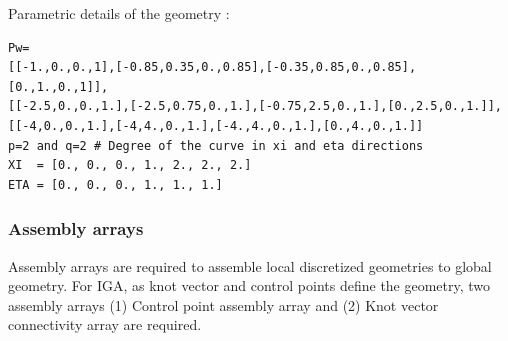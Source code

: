 \documentclass[11pt]{article}
\begin{document}
Parametric details of the geometry \cite{agrawal2019iga}:
\begin{verbatim}
Pw=
[[-1.,0.,0.,1],[-0.85,0.35,0.,0.85],[-0.35,0.85,0.,0.85],[0.,1.,0.,1]],
[[-2.5,0.,0.,1.],[-2.5,0.75,0.,1.],[-0.75,2.5,0.,1.],[0.,2.5,0.,1.]],
[[-4,0.,0.,1.],[-4,4.,0.,1.],[-4.,4.,0.,1.],[0.,4.,0.,1.]]
p=2 and q=2 # Degree of the curve in xi and eta directions
XI  = [0., 0., 0., 1., 2., 2., 2.]
ETA = [0., 0., 0., 1., 1., 1.]
\end{verbatim}


 

\subsubsection{Assembly arrays} \label{AssemblyArrays}
Assembly arrays are required to assemble local discretized geometries to global geometry. For IGA, as knot vector and control points define the geometry, two assembly arrays (1) Control point assembly array and (2) Knot vector connectivity array are required.
\end{document}
